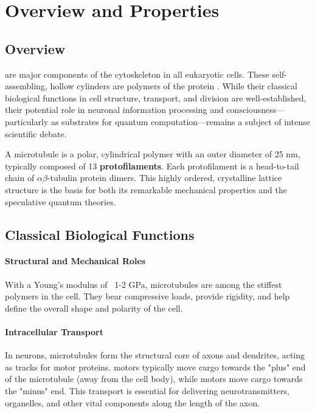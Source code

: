 \section{Overview and Properties}

\subsection{Overview}

 are major components of the cytoskeleton in all eukaryotic cells. These self-assembling, hollow cylinders are polymers of the protein . While their classical biological functions in cell structure, transport, and division are well-established, their potential role in neuronal information processing and consciousness—particularly as substrates for quantum computation—remains a subject of intense scientific debate.

\begin{keyconcept}
    A microtubule is a polar, cylindrical polymer with an outer diameter of 25 nm, typically composed of 13 \textbf{protofilaments}. Each protofilament is a head-to-tail chain of $\alpha\beta$-tubulin protein dimers. This highly ordered, crystalline lattice structure is the basis for both its remarkable mechanical properties and the speculative quantum theories.
\end{keyconcept}


\subsection{Classical Biological Functions}

\paragraph{Structural and Mechanical Roles}
With a Young's modulus of ~1-2 GPa, microtubules are among the stiffest polymers in the cell. They bear compressive loads, provide rigidity, and help define the overall shape and polarity of the cell.

\paragraph{Intracellular Transport}
In neurons, microtubules form the structural core of axons and dendrites, acting as tracks for motor proteins.  motors typically move cargo towards the "plus" end of the microtubule (away from the cell body), while  motors move cargo towards the "minus" end. This transport is essential for delivering neurotransmitters, organelles, and other vital components along the length of the axon.

